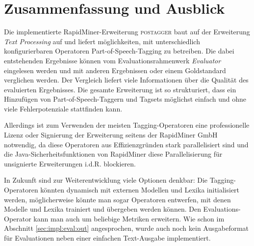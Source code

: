 %
\chapter{Zusammenfassung und Ausblick}
\label{sec:conclusion}

Die implementierte RapidMiner-Erweiterung \textsc{postagger} baut auf der Erweiterung \textit{Text Processing} auf und liefert möglichkeiten, mit unterschiedlich konfigurierbaren Operatoren Part-of-Speech-Tagging zu betreiben. Die dabei entstehenden Ergebnisse können vom Evaluationsrahmenwerk \textit{Evaluator} eingelesen werden und mit anderen Ergebnissen oder einem Goldstandard verglichen werden. Der Vergleich liefert viele Informationen über die Qualität des evaluierten Ergebnisses. Die gesamte Erweiterung ist so strukturiert, dass ein Hinzufügen von Part-of-Speech-Taggern und Tagsets möglichst einfach und ohne viele Fehlerpotenziale stattfinden kann.

Allerdings ist zum Verwenden der meisten Tagging-Operatoren eine professionelle Lizenz oder Signierung der Erweiterung seitens der RapidMiner GmbH notwendig, da diese Operatoren aus Effizienzgründen stark parallelisiert sind und die Java-Sicherheitsfunktionen von RapidMiner diese Parallelisierung für unsignierte Erweiterungen i.d.R. blockieren.

In Zukunft sind zur Weiterentwicklung viele Optionen denkbar: Die Tagging-Operatoren könnten dynamisch mit externen Modellen und Lexika initialisiert werden, möglicherweise könnte man sogar Operatoren entwerfen, mit denen Modelle und Lexika trainiert und übergeben werden können. Den Evaluations-Operator kann man auch um beliebige Metriken erweitern. Wie schon im Abschnitt \ref{sec:impl:eval:out} angesprochen, wurde auch noch kein Ausgabeformat für Evaluationen neben einer einfachen Text-Ausgabe implementiert.

